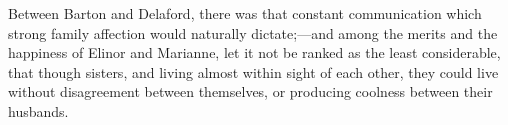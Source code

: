 Between Barton and Delaford, there was that constant
communication which strong family affection would
naturally dictate;---and among the merits and the happiness
of Elinor and Marianne, let it not be ranked as the least
considerable, that though sisters, and living almost within
sight of each other, they could live without disagreement
between themselves, or producing coolness between their husbands.



% 
% 
% 
